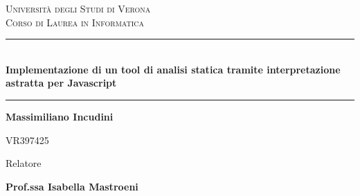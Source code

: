 \newcommand{\HRule}{\rule{\linewidth}{0.5mm}}
\thispagestyle{empty}

\begin{titlepage}
    \begin{center}
    
        \vspace*{1cm}
        \textsc{\LARGE Università degli Studi di Verona}\\[0.5cm] %
        \textsc{\Large Corso di Laurea in Informatica}\\ %
        
        \vfill
        
        \HRule \\[0.4cm]
        { \huge \textbf{Implementazione di un tool di analisi statica tramite
        interpretazione astratta per Javascript} }\\[0.2cm] %
        \HRule
        
        \vspace{3cm}
        \Large\textbf{Massimiliano Incudini}
        
        \vspace{0.25cm}
        \Large\textsf{VR397425}
        
        \vspace{2cm}
        \large Relatore 
        
        \vspace{0.25cm}
        \large\textbf{Prof.ssa Isabella Mastroeni}
        
    \end{center}
\end{titlepage}
